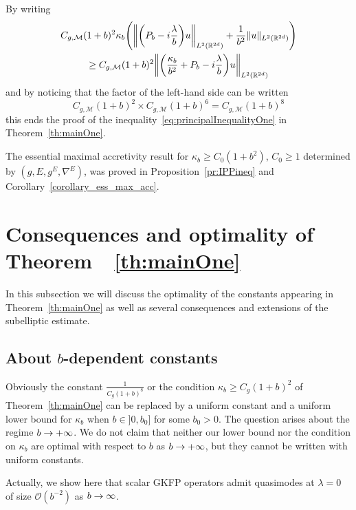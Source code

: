 \documentclass[AHL,Unicode,longabstracts]{cedram}
\newcommand{\R}{\mathbb{R}}
\newcommand{\clO}{\mathcal{O}}
\newcommand{\clM}{\mathcal{M}}
\let\originalleft\left
\let\originalright\right
\renewcommand{\left}{\mathopen{}\mathclose\bgroup\originalleft}
\renewcommand{\right}{\aftergroup\egroup\originalright}
\renewcommand*{\to}{\mathchoice{\longrightarrow}{\rightarrow}{\rightarrow}{\rightarrow}}
\begin{document}
By writing
\begin{multline*}
C_{g,\clM}(1+b)^2 \kappa_b \left(\left\|\left(P_b-i\frac{\lambda}{b}\right)u\right\|_{L^2(\R^{2d})} + \frac{1}{b^2}\|u\|_{L^2(\R^{2d})}
\right)\\
\geq C_{g,\clM}(1+b)^2 \left\|\left(\frac{\kappa_b}{b^2}+P_b-i\frac{\lambda}{b}\right)u\right\|_{L^2(\R^{2d})}
\end{multline*}
and by noticing that the factor of the left-hand side can be written
\[
C_{g,\clM}(1+b)^2 \times C_{g,\clM}(1+b)^6=C_{g,\clM}(1+b)^8
\]
this ends the proof of the inequality~\eqref{eq:principalInequalityOne} in Theorem~\ref{th:mainOne}.

The essential maximal accretivity result for $\kappa_{b}\geq C_{0}(1+b^{2})$, $C_{0}\geq 1$ determined by $(g,E,g^{E},\nabla^{E})$, was proved in Proposition~\ref{pr:IPPineq} and Corollary~\ref{corollary_ess_max_acc}.

\section{Consequences and optimality of Theorem~~\ref{th:mainOne}}\label{sec:conseqOpt}

In this subsection we will discuss the optimality of the constants appearing in Theorem~\ref{th:mainOne} as well as several consequences and extensions of the subelliptic estimate.

\subsection{About \texorpdfstring{$b$}{b}-dependent constants}\label{sec:bdep}
Obviously the constant $\frac{1}{C_{g}(1+b)^{8}}$ or the condition $\kappa_{b}\geq C_{g}(1+b)^{2}$ of Theorem~\ref{th:mainOne} can be replaced by a uniform constant and a uniform lower bound for $\kappa_{b}$ when $b\in]0,b_{0}]$ for some $b_{0}>0$. The question arises about the regime $b\to +\infty$. We do not claim that neither our lower bound nor the condition on $\kappa_{b}$ are optimal with respect to $b$ as $b\to +\infty$, but they cannot be written with uniform constants.

Actually, we show here that scalar GKFP operators admit quasimodes at $\lambda = 0$ of size $\clO(b^{-2})$ as $b \to \infty$.
\end{document}
